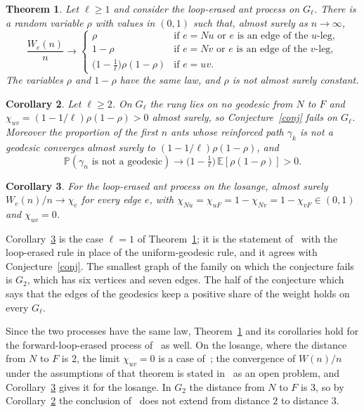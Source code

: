 \documentclass[11pt]{amsart}
\newtheorem{theorem}{Theorem}
\newtheorem{corollary}[theorem]{Corollary}
\theoremstyle{remark}
\newcommand{\PP}{\mathbb{P}}
\newcommand{\EE}{\mathbb{E}}
\begin{document}
\begin{theorem}\label{thm:main}
Let $\ell\ge1$ and consider the loop-erased ant process on $G_\ell$. There is a random variable $\rho$ with values in
$(0,1)$ such that, almost surely as $n\to\infty$,
\[
\frac{W_e(n)}{n}\longrightarrow
\begin{cases}
\rho & \text{if $e=Nu$ or $e$ is an edge of the $u$-leg,}\\
1-\rho & \text{if $e=Nv$ or $e$ is an edge of the $v$-leg,}\\
\bigl(1-\tfrac1\ell\bigr)\rho(1-\rho) & \text{if $e=uv$.}
\end{cases}
\]
The variables $\rho$ and $1-\rho$ have the same law, and $\rho$ is not almost surely constant.
\end{theorem}

\begin{corollary}\label{cor:fail}
Let $\ell\ge2$. On $G_\ell$ the rung lies on no geodesic from $N$ to $F$ and $\chi_{uv}=(1-1/\ell)\rho(1-\rho)>0$
almost surely, so Conjecture~\ref{conj} fails on $G_\ell$. Moreover the proportion of the first $n$ ants whose
reinforced path $\gamma_k$ is not a geodesic converges almost surely to $(1-1/\ell)\rho(1-\rho)$, and
\[
\PP(\gamma_n\text{ is not a geodesic})\longrightarrow\bigl(1-\tfrac1\ell\bigr)\,\EE[\rho(1-\rho)]>0 .
\]
\end{corollary}

\begin{corollary}\label{cor:losange}
For the loop-erased ant process on the losange, almost surely $W_e(n)/n\to\chi_e$ for every edge $e$, with
$\chi_{Nu}=\chi_{uF}=1-\chi_{Nv}=1-\chi_{vF}\in(0,1)$ and $\chi_{uv}=0$.
\end{corollary}

Corollary~\ref{cor:losange} is the case $\ell=1$ of Theorem~\ref{thm:main}; it is the statement
of~\cite[Theorem~1.4]{KMS} with the loop-erased rule in place of the uniform-geodesic rule, and it agrees with
Conjecture~\ref{conj}. The smallest graph of the family on which the conjecture fails is $G_2$, which has six vertices
and seven edges. The half of the conjecture which says that the edges of the geodesics keep a positive share of the
weight holds on every $G_\ell$.

Since the two processes have the same law, Theorem~\ref{thm:main} and its corollaries hold for the
forward-loop-erased process of~\cite{AM} as well. On the losange, where the distance from $N$ to $F$ is $2$, the limit $\chi_{uv}=0$ is a case
of~\cite[Theorem~1.1]{AM}; the convergence of $W(n)/n$ under the assumptions of that theorem is stated in~\cite{AM} as
an open problem, and Corollary~\ref{cor:losange} gives it for the losange. In $G_2$ the distance from $N$ to $F$ is
$3$, so by Corollary~\ref{cor:fail} the conclusion of~\cite[Theorem~1.1]{AM} does not extend from distance $2$ to
distance $3$.
\end{document}
